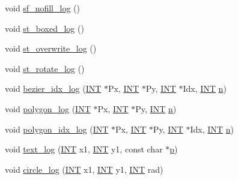 \begin{DoxyCompactItemize}
\item 
void \mbox{\hyperlink{classmp__graphics_aaf8c6cceb1227281515b288177e9bd28}{sf\+\_\+nofill\+\_\+log}} ()
\item 
void \mbox{\hyperlink{classmp__graphics_a594beff19a588fcd0808716caa44df20}{st\+\_\+boxed\+\_\+log}} ()
\item 
void \mbox{\hyperlink{classmp__graphics_a1928b1e403a6fe7a9498a38c91f37b29}{st\+\_\+overwrite\+\_\+log}} ()
\item 
void \mbox{\hyperlink{classmp__graphics_a1b98ac38cd95b2d44e9098f5dc2cc8a2}{st\+\_\+rotate\+\_\+log}} ()
\item 
void \mbox{\hyperlink{classmp__graphics_a7f1683ce5b50f629b40e8116c8c866c1}{bezier\+\_\+idx\+\_\+log}} (\mbox{\hyperlink{galois_8h_a09fddde158a3a20bd2dcadb609de11dc}{I\+NT}} $\ast$Px, \mbox{\hyperlink{galois_8h_a09fddde158a3a20bd2dcadb609de11dc}{I\+NT}} $\ast$Py, \mbox{\hyperlink{galois_8h_a09fddde158a3a20bd2dcadb609de11dc}{I\+NT}} $\ast$Idx, \mbox{\hyperlink{galois_8h_a09fddde158a3a20bd2dcadb609de11dc}{I\+NT}} \mbox{\hyperlink{simeon_8_c_a7f2cd26777ce0ff3fdaf8d02aacbddfb}{n}})
\item 
void \mbox{\hyperlink{classmp__graphics_ac7364cb768f58b2559a96b621d460b22}{polygon\+\_\+log}} (\mbox{\hyperlink{galois_8h_a09fddde158a3a20bd2dcadb609de11dc}{I\+NT}} $\ast$Px, \mbox{\hyperlink{galois_8h_a09fddde158a3a20bd2dcadb609de11dc}{I\+NT}} $\ast$Py, \mbox{\hyperlink{galois_8h_a09fddde158a3a20bd2dcadb609de11dc}{I\+NT}} \mbox{\hyperlink{simeon_8_c_a7f2cd26777ce0ff3fdaf8d02aacbddfb}{n}})
\item 
void \mbox{\hyperlink{classmp__graphics_aef990b1a5e84f4781ff613ce48fafe83}{polygon\+\_\+idx\+\_\+log}} (\mbox{\hyperlink{galois_8h_a09fddde158a3a20bd2dcadb609de11dc}{I\+NT}} $\ast$Px, \mbox{\hyperlink{galois_8h_a09fddde158a3a20bd2dcadb609de11dc}{I\+NT}} $\ast$Py, \mbox{\hyperlink{galois_8h_a09fddde158a3a20bd2dcadb609de11dc}{I\+NT}} $\ast$Idx, \mbox{\hyperlink{galois_8h_a09fddde158a3a20bd2dcadb609de11dc}{I\+NT}} \mbox{\hyperlink{simeon_8_c_a7f2cd26777ce0ff3fdaf8d02aacbddfb}{n}})
\item 
void \mbox{\hyperlink{classmp__graphics_a3a8320de1e68f3c290e138355f05f8ae}{text\+\_\+log}} (\mbox{\hyperlink{galois_8h_a09fddde158a3a20bd2dcadb609de11dc}{I\+NT}} x1, \mbox{\hyperlink{galois_8h_a09fddde158a3a20bd2dcadb609de11dc}{I\+NT}} y1, const char $\ast$\mbox{\hyperlink{alphabet2_8_c_a533391314665d6bf1b5575e9a9cd8552}{p}})
\item 
void \mbox{\hyperlink{classmp__graphics_a39416f00c1c310a76936674cdff82e49}{circle\+\_\+log}} (\mbox{\hyperlink{galois_8h_a09fddde158a3a20bd2dcadb609de11dc}{I\+NT}} x1, \mbox{\hyperlink{galois_8h_a09fddde158a3a20bd2dcadb609de11dc}{I\+NT}} y1, \mbox{\hyperlink{galois_8h_a09fddde158a3a20bd2dcadb609de11dc}{I\+NT}} rad)

\end{DoxyCompactItemize}
